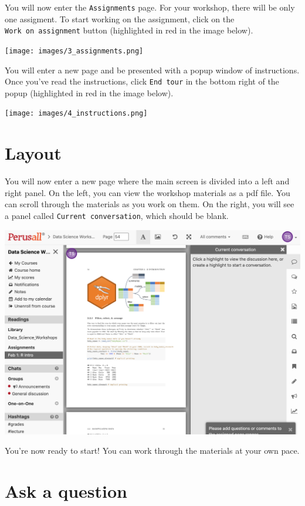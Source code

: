 \documentclass[]{book}
\begin{document}
You will now enter the \texttt{Assignments} page. For your workshop, there will be only one assigment. To start working on the assignment, click on the \texttt{Work\ on\ assignment} button (highlighted in red in the image below).

\texttt{[image: images/3\_assignments.png]}

You will enter a new page and be presented with a popup window of instructions. Once you've read the instructions, click \texttt{End\ tour} in the bottom right of the popup (highlighted in red in the image below).

\texttt{[image: images/4\_instructions.png]}

\hypertarget{layout}{%
\section{Layout}\label{layout}}

You will now enter a new page where the main screen is divided into a left and right panel. On the left, you can view the workshop materials as a pdf file. You can scroll through the materials as you work on them. On the right, you will see a panel called \texttt{Current\ conversation}, which should be blank.

\includegraphics{images/5_layout.png}

You're now ready to start! You can work through the materials at your own pace.

\hypertarget{ask-a-question}{%
\section{Ask a question}\label{ask-a-question}}
\end{document}
